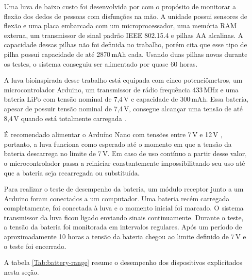 \documentclass[
	12pt,				%
	openright,			%
	oneside,			%
	a4paper,			%
	english,			%
	brazil				%
	]{abntex2}
\begin{document}
			Uma luva de baixo custo foi desenvolvida por \cite{simone2007lowcost} com o propósito de monitorar a flexão dos dedos de pessoas com disfunções na mão. A unidade possui sensores de flexão e uma placa embarcada com um microprocessador, uma memória RAM externa, um transmissor de sinal padrão IEEE 802.15.4 e pilhas AA alcalinas. A capacidade dessas pilhas não foi definida no trabalho, porém \cite{buchmann2016batteries} cita que esse tipo de pilha possui capacidade de até 2870$\,$mAh cada. Usando duas pilhas novas durante os testes, o sistema conseguiu ser alimentado por quase 60 horas.

			A luva bioinspirada desse trabalho está equipada com cinco potenciômetros, um microcontrolador Arduino, um transmissor de rádio frequência 433$\,$MHz e uma bateria LiPo com tensão nominal de 7,4$\,$V e capacidade de 300$\,$mAh. Essa bateria, apesar de possuir tensão nominal de 7,4$\,$V, consegue alcançar uma tensão de até 8,4$\,$V quando está totalmente carregada \cite{buchmann2016batteries}.

			É recomendado alimentar o Arduíno Nano com tensões entre 7$\,$V e 12$\,$V \cite{arduinopowerrange}, portanto, a luva funciona como esperado até o momento em que a tensão da bateria descarrega no limite de 7$\,$V. Em caso de uso contínuo a partir desse valor, o microcontrolador passa a reiniciar constantemente impossibilitando seu uso até que a bateria seja recarregada ou substituída.

			Para realizar o teste de desempenho da bateria, um módulo receptor junto a um Arduino foram conectados a um computador. Uma bateria recém carregada completamente, foi conectada à luva e o momento inicial foi marcado. O sistema transmissor da luva ficou ligado enviando sinais continuamente. Durante o teste, a tensão da bateria foi monitorada em intervalos regulares. Após um período de aproximadamente 10 horas a tensão da bateria chegou ao limite definido de 7$\,$V e o teste foi encerrado.

			A tabela \ref{Tab:battery-range} resume o desempenho dos dispositivos explicitados nesta seção.

                          
\end{document}
